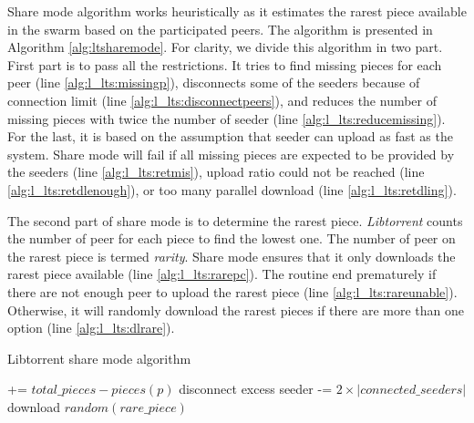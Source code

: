 Share mode algorithm works heuristically as it estimates the rarest piece available in the swarm based on the participated peers. The algorithm is presented in Algorithm \ref{alg:ltsharemode}. For clarity, we divide this algorithm in two part. First part is to pass all the restrictions. It tries to find missing pieces for each peer (line \ref{alg:l_lts:missingp}), disconnects some of the seeders because of connection limit (line \ref{alg:l_lts:disconnectpeers}), and reduces the number of missing pieces with twice the number of seeder (line \ref{alg:l_lts:reducemissing}). For the last, it is based on the assumption that seeder can upload as fast as the system. Share mode will fail if all missing pieces are expected to be provided by the seeders (line \ref{alg:l_lts:retmis}), upload ratio could not be reached (line \ref{alg:l_lts:retdlenough}), or too many parallel download (line \ref{alg:l_lts:retdling}).

The second part of share mode is to determine the rarest piece. \textit{Libtorrent} counts the number of peer for each piece to find the lowest one. The number of peer on the rarest piece is termed \textit{rarity}. Share mode ensures that it only downloads the rarest piece available (line \ref{alg:l_lts:rarepc}). The routine end prematurely if there are not enough peer to upload the rarest piece (line \ref{alg:l_lts:rareunable}). Otherwise, it will randomly download the rarest pieces if there are more than one option (line \ref{alg:l_lts:dlrare}). 

\begin{algorithm}[h!]
	\caption{Libtorrent share mode algorithm}
	\label{alg:ltsharemode}
	\begin{algorithmic}[1]
		\Statex \hrulefill {}
		 += {$total\_pieces - pieces(p)$} \label{alg:l_lts:missingp}
		\EndIf	
		\EndFor
		\State disconnect excess seeder \label{alg:l_lts:disconnectpeers}
		\EndIf
		 -= {$2 \times |connected\_seeders|$}	\label{alg:l_lts:reducemissing}	
		  \label{alg:l_lts:retmis}
		\State \Return 
		\EndIf
		 \label{alg:l_lts:retdlenough}
		\State \Return
		\EndIf
		 \label{alg:l_lts:retdling}
		\State \Return
		\EndIf
		\Statex \hrulefill {}
			\label{alg:l_lts:rarepc}
		\EndIf	
		\EndFor
		 \label{alg:l_lts:rareunable}
		\State \Return
		\EndIf
		\State download {$random(rare\_piece)$} \label{alg:l_lts:dlrare}
	\end{algorithmic}
\end{algorithm}

